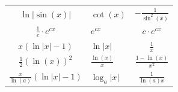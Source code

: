 \documentclass[a4paper,10pt]{article}
\begin{document}
\begin{center}
\begin{tabularx}{\linewidth}{c>{\centering\arraybackslash}Xc}
						$\ln | \sin(x)|$                       & $\cot(x)$                & $-\frac{1}{\sin^2(x)}$         \\
						$\frac{1}{c} \cdot e^{cx}$             & $e^{cx}$                 & $c \cdot e^{cx}$               \\
						$x(\ln |x| - 1)$                       & $\ln |x|$                & $\frac{1}{x}$                  \\
						$\frac{1}{2}(\ln(x))^2$                & $\frac{\ln(x)}{x}$       & $\frac{1 - \ln(x)}{x^2}$       \\
						$\frac{x}{\ln(a)} (\ln|x| -1)$         & $\log_a |x|$             & $\frac{1}{\ln(a)x}$            \\
						\bottomrule
					\end{tabularx}
				\end{center}
\end{document}

